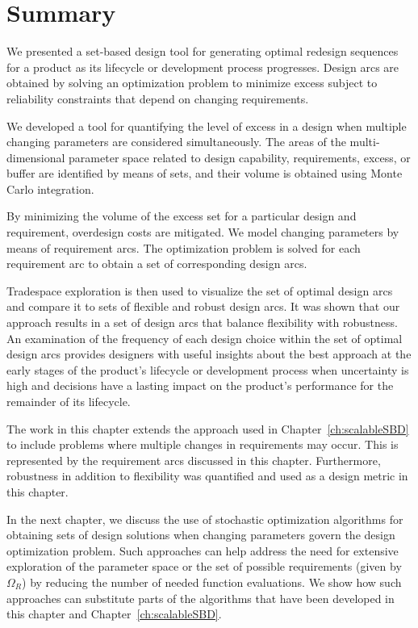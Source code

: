 \section{Summary}
\label{sec:TSEcontsummary}

We presented a set-based design tool for generating optimal redesign sequences for a product as its lifecycle or development process progresses. Design arcs are obtained by solving an optimization problem to minimize excess subject to reliability constraints that depend on changing requirements.

We developed a tool for quantifying the level of excess in a design when multiple changing parameters are considered simultaneously. The areas of the multi-dimensional parameter space related to design capability, requirements, excess, or buffer are identified by means of sets, and their volume is obtained using Monte Carlo integration.

By minimizing the volume of the excess set for a particular design and requirement, overdesign costs are mitigated. We model changing parameters by means of requirement arcs. The optimization problem is solved for each requirement arc to obtain a set of corresponding design arcs.

Tradespace exploration is then used to visualize the set of optimal design arcs and compare it to sets of flexible and robust design arcs. It was shown that our approach results in a set of design arcs that balance flexibility with robustness. An examination of the frequency of each design choice within the set of optimal design arcs provides designers with useful insights about the best approach at the early stages of the product's lifecycle or development process when uncertainty is high and decisions have a lasting impact on the product's performance for the remainder of its lifecycle.

The work in this chapter extends the approach used in Chapter~\ref{ch:scalableSBD} to include problems where multiple changes in requirements may occur. This is represented by the requirement arcs discussed in this chapter. Furthermore, robustness in addition to flexibility was quantified and used as a design metric in this chapter.

In the next chapter, we discuss the use of stochastic optimization algorithms for obtaining sets of design solutions when changing parameters govern the design optimization problem. Such approaches can help address the need for extensive exploration of the parameter space or the set of possible requirements (given by $\Omega_R$) by reducing the number of needed function evaluations. We show how such approaches can substitute parts of the algorithms that have been developed in this chapter and Chapter~\ref{ch:scalableSBD}.